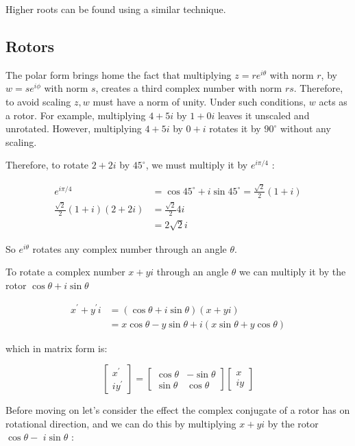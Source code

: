 \documentclass[10pt]{article}
\begin{document}
Higher roots can be found using a similar technique.

\subsection{Rotors}
The polar form brings home the fact that multiplying $z=r e^{i \theta}$ with norm $r$, by $w=s e^{i \phi}$ with norm $s$, creates a third complex number with norm $r s$. Therefore, to avoid scaling $z, w$ must have a norm of unity. Under such conditions, $w$ acts as a rotor. For example, multiplying $4+5 i$ by $1+0 i$ leaves it unscaled and unrotated. However, multiplying $4+5 i$ by $0+i$ rotates it by $90^{\circ}$ without any scaling.

Therefore, to rotate $2+2 i$ by $45^{\circ}$, we must multiply it by $e^{i \pi / 4}$ :

$$
\begin{aligned}
e^{i \pi / 4} & =\cos 45^{\circ}+i \sin 45^{\circ}=\frac{\sqrt{2}}{2}(1+i) \\
\frac{\sqrt{2}}{2}(1+i)(2+2 i) & =\frac{\sqrt{2}}{2} 4 i \\
& =2 \sqrt{2} i
\end{aligned}
$$

So $e^{i \theta}$ rotates any complex number through an angle $\theta$.

To rotate a complex number $x+y i$ through an angle $\theta$ we can multiply it by the rotor $\cos \theta+i \sin \theta$

$$
\begin{aligned}
x^{\prime}+y^{\prime} i & =(\cos \theta+i \sin \theta)(x+y i) \\
& =x \cos \theta-y \sin \theta+i(x \sin \theta+y \cos \theta)
\end{aligned}
$$

which in matrix form is:

$$
\left[\begin{array}{r}
x^{\prime} \\
i y^{\prime}
\end{array}\right]=\left[\begin{array}{rr}
\cos \theta & -\sin \theta \\
\sin \theta & \cos \theta
\end{array}\right]\left[\begin{array}{c}
x \\
i y
\end{array}\right]
$$

Before moving on let's consider the effect the complex conjugate of a rotor has on rotational direction, and we can do this by multiplying $x+y i$ by the rotor $\cos \theta-$ $i \sin \theta$ :
\end{document}
